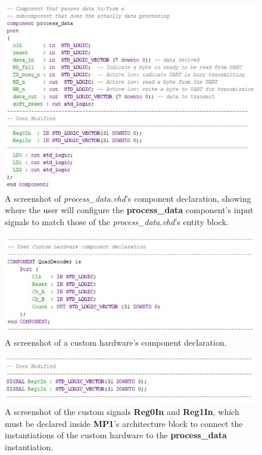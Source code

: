 \begin{figure}[H]
	\begin{center}
	\includegraphics[scale=0.5]{fig/r2u2_hw_mp1_component.pdf}
	\caption{A screenshot of \textit{process\_data.vhd}'s component declaration, showing where the user will configure the \textbf{process\_data} component's input signals to match those of the \textit{process\_data.vhd}'s entity block.
	\label{fig:r2u2hwMP1Comp}} 
	\end{center}
\end{figure}

\begin{figure}[H]
	\begin{center}
	\includegraphics[scale=0.5]{fig/r2u2_hw_mp1_custom_comp.pdf}
	\caption{A screenshot of a custom hardware's component declaration.
	\label{fig:r2u2hwMP1customComp}} 
	\end{center}
\end{figure}

\begin{figure}[H]
	\begin{center}
	\includegraphics[scale=0.5]{fig/r2u2_hw_mp1_custom_signals.pdf}
	\caption{A screenshot of the custom signals \textbf{Reg0In} and \textbf{Reg1In}, which must be declared inside \textbf{MP1}'s architecture block to connect the instantiations of the custom hardware to the \textbf{process\_data} instantiation.
	\label{fig:r2u2hwMP1customSig}} 
	\end{center}
\end{figure}

